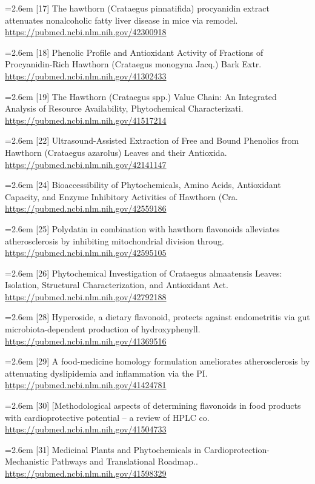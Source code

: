 \documentclass[11pt]{article}
\begin{document}
{\noindent\hangindent=2.6em [17] The hawthorn (Crataegus pinnatifida) procyanidin extract attenuates nonalcoholic fatty liver disease in mice via remodel. \url{https://pubmed.ncbi.nlm.nih.gov/42300918}\par
\noindent\hangindent=2.6em [18] Phenolic Profile and Antioxidant Activity of Fractions of Procyanidin-Rich Hawthorn (Crataegus monogyna Jacq.) Bark Extr. \url{https://pubmed.ncbi.nlm.nih.gov/41302433}\par
\noindent\hangindent=2.6em [19] The Hawthorn (Crataegus spp.) Value Chain: An Integrated Analysis of Resource Availability, Phytochemical Characterizati. \url{https://pubmed.ncbi.nlm.nih.gov/41517214}\par
\noindent\hangindent=2.6em [22] Ultrasound-Assisted Extraction of Free and Bound Phenolics from Hawthorn (Crataegus azarolus) Leaves and their Antioxida. \url{https://pubmed.ncbi.nlm.nih.gov/42141147}\par
\noindent\hangindent=2.6em [24] Bioaccessibility of Phytochemicals, Amino Acids, Antioxidant Capacity, and Enzyme Inhibitory Activities of Hawthorn (Cra. \url{https://pubmed.ncbi.nlm.nih.gov/42559186}\par
\noindent\hangindent=2.6em [25] Polydatin in combination with hawthorn flavonoids alleviates atherosclerosis by inhibiting mitochondrial division throug. \url{https://pubmed.ncbi.nlm.nih.gov/42595105}\par
\noindent\hangindent=2.6em [26] Phytochemical Investigation of Crataegus almaatensis Leaves: Isolation, Structural Characterization, and Antioxidant Act. \url{https://pubmed.ncbi.nlm.nih.gov/42792188}\par
\noindent\hangindent=2.6em [28] Hyperoside, a dietary flavonoid, protects against endometritis via gut microbiota-dependent production of hydroxyphenyll. \url{https://pubmed.ncbi.nlm.nih.gov/41369516}\par
\noindent\hangindent=2.6em [29] A food-medicine homology formulation ameliorates atherosclerosis by attenuating dyslipidemia and inflammation via the PI. \url{https://pubmed.ncbi.nlm.nih.gov/41424781}\par
\noindent\hangindent=2.6em [30] [Methodological aspects of determining flavonoids in food products with cardioprotective potential -- a review of HPLC co. \url{https://pubmed.ncbi.nlm.nih.gov/41504733}\par
\noindent\hangindent=2.6em [31] Medicinal Plants and Phytochemicals in Cardioprotection-Mechanistic Pathways and Translational Roadmap.. \url{https://pubmed.ncbi.nlm.nih.gov/41598329}\par
}
\end{document}
